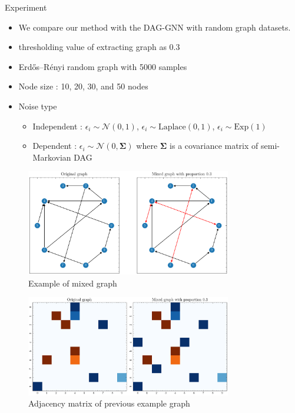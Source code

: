 \documentclass{beamer}
\begin{document}
\begin{frame}[allowframebreaks]{Experiment}
    \begin{itemize}
        \item We compare our method with the DAG-GNN \cite{yu2019daggnn} with random graph datasets.
        \item thresholding value of extracting graph as 0.3
        \item Erdős–Rényi random graph with 5000 samples
        \item Node size : 10, 20, 30, and 50 nodes
        \item Noise type
        \begin{itemize}
            \item Independent : $\epsilon_i \sim \mathcal N(0, 1)$, $\epsilon_i \sim \text{Laplace}(0, 1)$, $\epsilon_i \sim \text{Exp}(1)$
            \item Dependent : $\epsilon_i \sim \mathcal N(0, \mathbf \Sigma)$ where $\mathbf \Sigma$ is a covariance matrix of semi-Markovian DAG
        \end{itemize}
    \end{itemize}
    \begin{figure}
        \centering
        \includegraphics[width=0.8\textwidth]{fig/mixed_graph_example.png}
        \caption{Example of mixed graph}
        \label{fig:mixed_graph_example}
    \end{figure}
    \begin{figure}
        \centering
        \includegraphics[width=0.8\textwidth]{fig/mixed_graph_adjacency.png}
        \caption{Adjacency matrix of previous example graph}
        \label{fig:mixed_graph_adjacency}
    \end{figure}
\end{frame}
\end{document}
